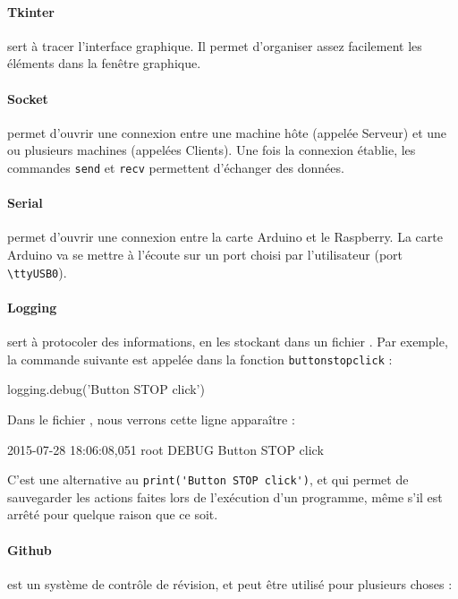 \documentclass[12pt,a4paper]{report}
\begin{document}
\paragraph{Tkinter} sert à tracer l'interface graphique. Il permet d'organiser assez facilement les éléments dans la fenêtre graphique.

\paragraph{Socket} permet d'ouvrir une connexion entre une machine hôte (appelée Serveur) et une ou plusieurs machines (appelées Clients). Une fois la connexion établie, les commandes \verb=send= et \verb=recv= permettent d'échanger des données.

\paragraph{Serial} permet d'ouvrir une connexion entre la carte Arduino et le Raspberry. La carte Arduino va se mettre à l'écoute sur un port choisi par l'utilisateur (port \verb=\ttyUSB0=). 

\paragraph{Logging} sert à protocoler des informations, en les stockant dans un fichier . Par exemple, la commande suivante est appelée dans la fonction \verb=buttonstopclick= :

\begin{verbatimtab}[3]
logging.debug('Button STOP click')
\end{verbatimtab}

Dans le fichier , nous verrons cette ligne apparaître :

\begin{verbatimtab}[3]
2015-07-28 18:06:08,051 root	DEBUG	Button STOP click
\end{verbatimtab}

C'est une alternative au \verb=print('Button STOP click')=, et qui permet de sauvegarder les actions faites lors de l'exécution d'un programme, même s'il est arrêté pour quelque raison que ce soit.

\paragraph{Github} est un système de contrôle de révision, et peut être utilisé pour plusieurs choses :
\end{document}
